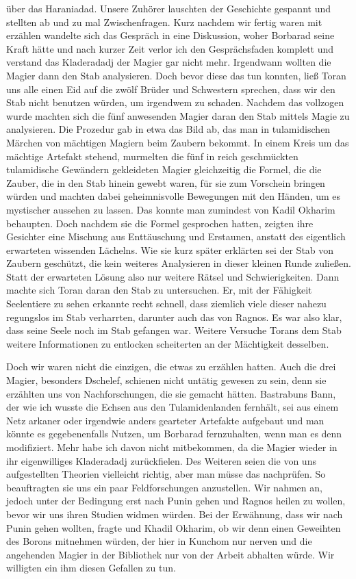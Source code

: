 über das Haraniadad. Unsere Zuhörer lauschten der Geschichte gespannt und stellten ab und zu mal Zwischenfragen. Kurz nachdem wir fertig waren mit erzählen wandelte sich das Gespräch in eine Diskussion, woher Borbarad seine Kraft hätte und nach kurzer Zeit verlor ich den Gesprächsfaden komplett und verstand das Kladeradadj der Magier gar nicht mehr. Irgendwann wollten die Magier dann den Stab analysieren. Doch bevor diese das tun konnten, ließ Toran uns alle einen Eid auf die zwölf Brüder und Schwestern sprechen, dass wir den Stab nicht benutzen würden, um irgendwem zu schaden. Nachdem das vollzogen wurde machten sich die fünf anwesenden Magier daran den Stab mittels Magie zu analysieren. Die Prozedur gab in etwa das Bild ab, das man in tulamidischen Märchen von mächtigen Magiern beim Zaubern bekommt. In einem Kreis um das mächtige Artefakt stehend, murmelten die fünf in reich geschmückten tulamidische Gewändern gekleideten Magier gleichzeitig die Formel, die die Zauber, die in den Stab hinein gewebt waren, für sie zum Vorschein bringen würden und machten dabei geheimnisvolle Bewegungen mit den Händen, um es mystischer aussehen zu lassen. Das konnte man zumindest von Kadil Okharim behaupten. Doch nachdem sie die Formel gesprochen hatten, zeigten ihre Gesichter eine Mischung aus Enttäuschung und Erstaunen, anstatt des eigentlich erwarteten wissenden Lächelns. Wie sie kurz später erklärten sei der Stab von Zaubern geschützt, die kein weiteres Analysieren in dieser kleinen Runde zuließen. Statt der erwarteten Lösung also nur weitere Rätsel und Schwierigkeiten. Dann machte sich Toran daran den Stab zu untersuchen. Er, mit der Fähigkeit Seelentiere zu sehen erkannte recht schnell, dass ziemlich viele dieser nahezu regungslos im Stab verharrten, darunter auch das von Ragnos. Es war also klar, dass seine Seele noch im Stab gefangen war. Weitere Versuche Torans dem Stab weitere Informationen zu entlocken scheiterten an der Mächtigkeit desselben.

Doch wir waren nicht die einzigen, die etwas zu erzählen hatten. Auch die drei Magier, besonders Dschelef, schienen nicht untätig gewesen zu sein, denn sie erzählten uns von Nachforschungen, die sie gemacht hätten. Bastrabuns Bann, der wie ich wusste die Echsen aus den Tulamidenlanden fernhält, sei aus einem Netz arkaner oder irgendwie anders gearteter Artefakte aufgebaut und man könnte es gegebenenfalls Nutzen, um Borbarad fernzuhalten, wenn man es denn modifiziert. Mehr habe ich davon nicht mitbekommen, da die Magier wieder in ihr eigenwilliges Kladeradadj zurückfielen. Des Weiteren seien die von uns aufgestellten Theorien vielleicht richtig, aber man müsse das nachprüfen. So beauftragten sie uns ein paar Feldforschungen anzustellen. Wir nahmen an, jedoch unter der Bedingung erst nach Punin gehen und Ragnos heilen zu wollen, bevor wir uns ihren Studien widmen würden. Bei der Erwähnung, dass wir nach Punin gehen wollten, fragte und Khadil Okharim, ob wir denn einen Geweihten des Borons mitnehmen würden, der hier in Kunchom nur nerven und die angehenden Magier in der Bibliothek nur von der Arbeit abhalten würde. Wir willigten ein ihm diesen Gefallen zu tun.

